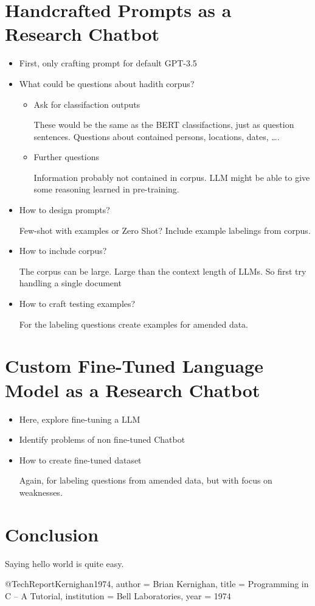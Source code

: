 \documentclass[english, version-2022-01]{uzl-thesis}
\begin{document}
\chapter{Handcrafted Prompts as a Research Chatbot}
\label{chapter-main}
\begin{itemize}
	\item First, only crafting prompt for default GPT-3.5
	\item What could be questions about hadith corpus?
	      \begin{itemize}
		      \item Ask for classifaction outputs

		            These would be the same as the BERT classifactions, just as question sentences. Questions about contained persons, locations, dates, \dots.
		      \item Further questions

		            Information probably not contained in corpus. LLM might be able to give some reasoning learned in pre-training.
	      \end{itemize}
	\item How to design prompts?

	      Few-shot with examples or Zero Shot? Include example labelings from corpus.
	\item How to include corpus?

	      The corpus can be large. Large than the context length of LLMs. So first try handling a single document
	\item How to craft testing examples?

	      For the labeling questions create examples for amended data.
\end{itemize}
\chapter{Custom Fine-Tuned Language Model as a Research Chatbot}
\begin{itemize}
	\item Here, explore fine-tuning a LLM
	\item Identify problems of non fine-tuned Chatbot
	\item How to create fine-tuned dataset

	      Again, for labeling questions from amended data, but with focus on weaknesses.
\end{itemize}
\chapter{Conclusion}
Saying hello world is quite easy.
\begin{bibtex-entries}
@TechReport{Kernighan1974,
	author = {Brian Kernighan},
	title = {Programming in C – A Tutorial},
	institution = {Bell Laboratories},
	year = {1974}
}
\end{bibtex-entries}
\end{document}

